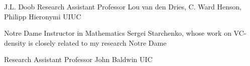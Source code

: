 \documentclass[11pt]{letter}
\begin{document}









\coverletter
  {\uiuc}
  {}
  {J.L. Doob Research Assistant Professor}
  {\mathjobs}
  {Lou van den Dries, C. Ward Henson, Philipp Hieronymi}
  {UIUC}
  {\generic}

\coverletter
  {\unotredame}
  {}
  {Notre Dame Instructor in Mathematics}
  {\mathjobs}
  {Sergei Starchenko, whose work on VC-density is closely related to my research}
  {Notre Dame}
  {\generic}

\coverletter
  {\uic}
  {}
  {Research Assistant Professor}
  {\mathjobs}
  {John Baldwin}
  {UIC}
  {\generic}
\end{document}
